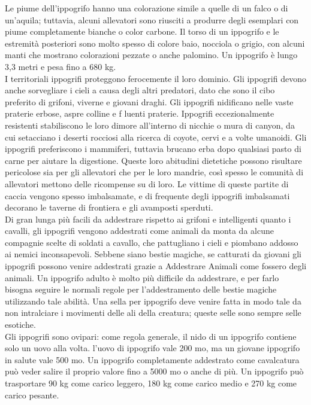\begin{multicols}{2}
Le piume dell'ippogrifo hanno una colorazione simile a quelle di un falco o di un’aquila; tuttavia, alcuni allevatori sono riusciti a produrre degli esemplari con piume completamente bianche o color carbone. Il torso di un ippogrifo e le estremità posteriori sono molto spesso di colore baio, nocciola o grigio, con alcuni manti che mostrano colorazioni pezzate o anche palomino. Un ippogrifo è lungo 3,3 metri e pesa fino a 680 kg.\\

I territoriali ippogrifi proteggono ferocemente il loro dominio. Gli ippogrifi devono anche sorvegliare i cieli a causa degli altri predatori, dato che sono il cibo preferito di grifoni, viverne e giovani draghi. Gli ippogrifi nidificano nelle vaste praterie erbose, aspre colline e f luenti praterie. Ippogrifi eccezionalmente resistenti stabiliscono le loro dimore all'interno di nicchie o mura di canyon, da cui setacciano i deserti rocciosi alla ricerca di coyote, cervi e a volte umanoidi. Gli ippogrifi preferiscono i mammiferi, tuttavia brucano erba dopo qualsiasi pasto di carne per aiutare la digestione. Queste loro abitudini dietetiche possono risultare pericolose sia per gli allevatori che per le loro mandrie, così spesso le comunità di allevatori mettono delle ricompense su di loro. Le vittime di queste partite di caccia vengono spesso imbalsamate, e di frequente degli ippogrifi imbalsamati decorano le taverne di frontiera e gli avamposti sperduti.\\

Di gran lunga più facili da addestrare rispetto ai grifoni e intelligenti quanto i cavalli, gli ippogrifi vengono addestrati come animali da monta da alcune compagnie scelte di soldati a cavallo, che pattugliano i cieli e piombano addosso ai nemici inconsapevoli. Sebbene siano bestie magiche, se catturati da giovani gli ippogrifi possono venire addestrati grazie a Addestrare Animali come fossero degli animali. Un ippogrifo adulto è molto più difficile da addestrare, e per farlo bisogna seguire le normali regole per l'addestramento delle bestie magiche utilizzando tale abilità. Una sella per ippogrifo deve venire fatta in modo tale da non intralciare i movimenti delle ali della creatura; queste selle sono sempre selle esotiche.\\

Gli ippogrifi sono ovipari: come regola generale, il nido di un ippogrifo contiene solo un uovo alla volta. l'uovo di ippogrifo vale 200 mo, ma un giovane ippogrifo in salute vale 500 mo. Un ippogrifo completamente addestrato come cavalcatura può veder salire il proprio valore fino a 5000 mo o anche di più. Un ippogrifo può trasportare 90 kg come carico leggero, 180 kg come carico medio e 270 kg come carico pesante.\\


\end{multicols}

